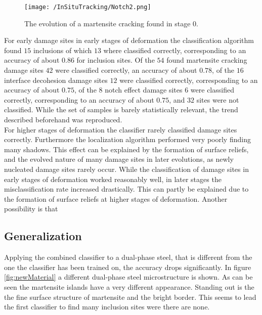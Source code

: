 \begin{figure}
\texttt{[image: /InSituTracking/Notch2.png]}
\caption{The evolution of a martensite cracking found in stage 0.}
\label{fig:NEEV2}
\end{figure}



For early damage sites in early stages of deformation the classification algorithm found $15$ inclusions of which $13$ where classified correctly, corresponding to an accuracy of about $0.86$ for inclusion sites. Of the $54$ found martensite cracking damage sites $42$ were classified correctly, an accuracy of about $0.78$, of the $16$ interface decohesion damage sites $12$ were classified correctly, corresponding to an accuracy of about $0.75$, of the $8$ notch effect damage sites $6$ were classified correctly, corresponding to an accuracy of about $0.75$, and $32$ sites were not classified. While the set of samples is barely statistically relevant, the trend described beforehand was reproduced. \\

For higher stages of deformation the classifier rarely classified damage sites correctly. Furthermore the localization algorithm performed very poorly finding many shadows. This effect can be explained by the formation of surface reliefs, and the evolved nature of many damage sites in later evolutions, as newly nucleated damage sites rarely occur. 
While the classification of damage sites in early stages of deformation worked reasonably well, in later stages the misclassification rate increased drastically. This can partly be explained due to the formation of surface reliefs at higher stages of deformation. Another possibility is that 

\subsection{Generalization}

Applying the combined classifier to a dual-phase steel, that is different from the one the classifier has been trained on, the accuracy drops significantly. In figure \ref{fig:newMaterial} a different dual-phase steel microstructure is shown. As can be seen the martensite islands have a very different appearance. Standing out is the the fine surface structure of martensite and the bright border. This seems to lead the first classifier to find many inclusion sites were there are none.

